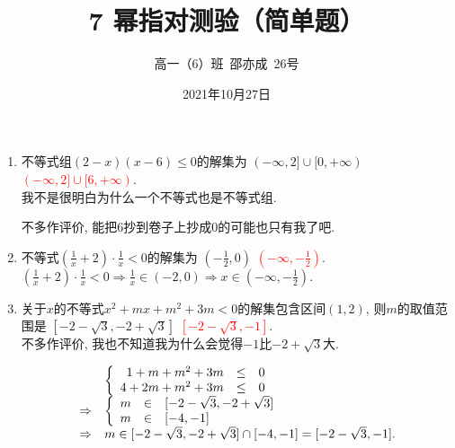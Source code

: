 \documentclass[8pt]{article}
\author{高一（6）班\ 邵亦成\ 26号}
\title{7 幂指对测验（简单题）}
\date{2021年10月27日}
\begin{document}
	\maketitle

	\begin{enumerate}[label=(\arabic*)]
		\item 不等式组$(2-x)(x-6)\leq 0$的解集为 \st{$(-\infty , 2]\cup [0, +\infty)$} \textcolor{red}{$(-\infty, 2]\cup[6, +\infty)$}.
			~\\

			\st{$\text{我不是很明白为什么一个不等式也是不等式组}$}.	

			不多作评价, 能把6抄到卷子上抄成0的可能也只有我了吧.

		\item 不等式$\displaystyle \left(\frac{1}{x}+2\right)\cdot\frac{1}{x}<0$的解集为 \st{$\displaystyle \left(-\frac{1}{2}, 0\right)$} \textcolor{red}{$\displaystyle \left(-\infty, -\frac{1}{2}\right)$}.
			~\\

			$\displaystyle \left(\frac{1}{x}+2\right)\cdot\frac{1}{x}<0 \Rightarrow \frac{1}{x} \in (-2, 0) \Rightarrow x \in \left(-\infty, -\frac{1}{2}\right).$

		\item 关于$x$的不等式$x^2+mx+m^2+3m<0$的解集包含区间$(1, 2)$, 则$m$的取值范围是 \st{$[-2-\sqrt{3}, -2+\sqrt{3}]$} \textcolor{red}{$[-2-\sqrt{3}, -1]$}.
			~\\

			不多作评价, 我也不知道我为什么会觉得$-1$比$-2+\sqrt{3}$大.

			$$
			\begin{array}{cl}
				&\left\{
				\begin{array}{rcl}
					1+m+m^2+3m&\leq&0\\
					4+2m+m^2+3m&\leq&0\\
				\end{array}
				\right.\\
				\Rightarrow&
				\left\{
				\begin{array}{rcl}
					m&\in&[-2-\sqrt{3}, -2+\sqrt{3}]\\
					m&\in&[-4, -1]\\
				\end{array}
				\right.\\
				\Rightarrow&
				m\in[-2-\sqrt{3}, -2+\sqrt{3}]\cap[-4, -1]=[-2-\sqrt{3}, -1].
			\end{array}\\
			$$

	\end{enumerate}
\end{document}
